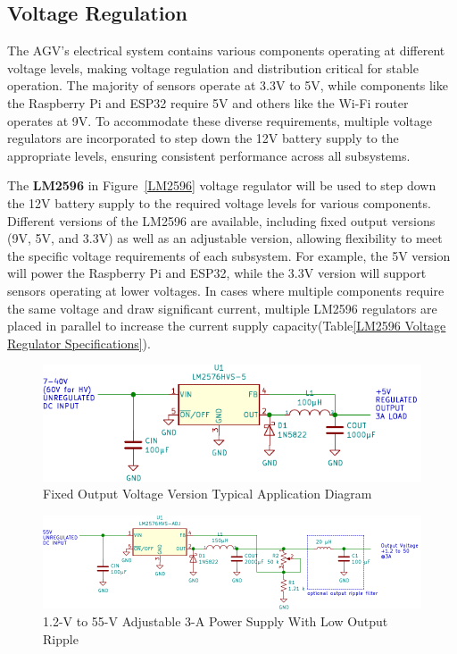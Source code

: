 \documentclass[../../main]{subfiles}
\begin{document}
\subsection{Voltage Regulation}

The AGV's electrical system contains various components operating 
at different voltage levels, making voltage regulation and 
distribution critical for stable operation. The majority of 
sensors operate at 3.3V to 5V, while components like the Raspberry Pi 
and ESP32 require 5V and others like the Wi-Fi router operates at 9V. 
To accommodate these diverse requirements, multiple voltage regulators 
are incorporated to step down the 12V battery supply to the appropriate 
levels, ensuring consistent performance across all subsystems. 


The \textbf{LM2596} in Figure~\ref{LM2596} voltage regulator will be used to step down the 12V battery 
supply to the required voltage levels for various components. Different 
versions of the LM2596 are available, including fixed output versions 
(9V, 5V, and 3.3V) as well as an adjustable version, allowing flexibility 
to meet the specific voltage requirements of each subsystem. For example, 
the 5V version will power the Raspberry Pi and ESP32, while the 3.3V version 
will support sensors operating at lower voltages. In cases where multiple 
components require the same voltage and draw significant current, multiple 
LM2596 regulators are placed in parallel to increase the current supply 
capacity(Table\ref{LM2596 Voltage Regulator Specifications}).

\begin{figure} 
    \centering
    \includegraphics[width=0.7\textheight]{fig/lm2576.pdf}
    \caption{ Fixed Output Voltage Version Typical Application Diagram}
    \label{LM2596 Fixed Output Voltage} 
\end{figure}

\begin{figure} 
    \centering
    \includegraphics[width=0.7\textheight]{fig/lm2576_module_adj.pdf}
    \caption{1.2-V to 55-V Adjustable 3-A Power Supply With Low Output Ripple}
    \label{LM2596 Adjustable Output Voltage} 
\end{figure}
\end{document}
